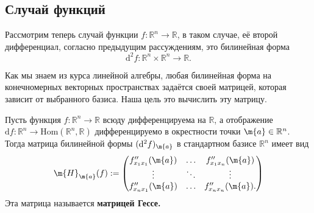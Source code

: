 \subsection{Случай функций}

Рассмотрим теперь случай функции $f:\mathbb{R}^n \to \mathbb{R}$, в таком случае, её второй дифференциал, согласно предыдущим рассуждениям, это билинейная форма 
\[
 \mathrm{d}^2f:\mathbb{R}^n \times \mathbb{R}^n \to \mathbb{R}.
\]

Как мы знаем из курса линейной алгебры, любая билинейная форма на конечномерных векторных пространствах задаётся своей матрицей, которая зависит от выбранного базиса.  Наша цель это вычислить эту матрицу.


\begin{theorem}
Пусть функция $f:\mathbb{R}^n \to \mathbb{R}$ всюду дифференцируема на $\mathbb{R}$, а отображение $\mathrm{d}f: \mathbb{R}^n \to \mathrm{Hom}(\mathbb{R}^n, \mathbb{R})$ дифференцируемо в окрестности точки $\m{a} \in \mathbb{R}^n$. Тогда матрица билинейной формы $(\mathrm{d}^2f)_\m{a}$ в стандартном базисе $\mathbb{R}^n$ имеет вид 
 \[
     \m{H}_\m{a}(f): = \begin{pmatrix}
         f''_{x_1x_1}(\m{a}) & \ldots & f''_{x_1  x_n}(\m{a}) \\
         \vdots & \ddots & \vdots \\
         f''_{x_n x_1}(\m{a}) &  \ldots & f''_{ x_n x_n}(\m{a}).
     \end{pmatrix}
    \]
Эта матрица называется \textbf{матрицей Гессе.}
\end{theorem}



